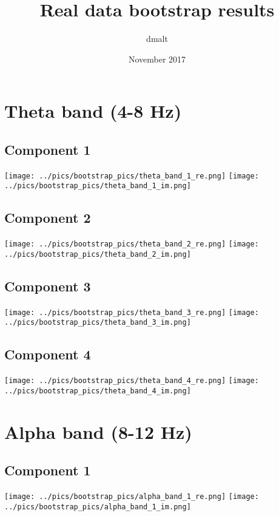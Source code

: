 \documentclass{article}
\title{Real data bootstrap results}
\author{dmalt}
\date{November 2017}
\begin{document}
\newpage
\section{Theta band (4-8 Hz)}
\centering
\subsection*{Component 1}
\texttt{[image: ../pics/bootstrap\_pics/theta\_band\_1\_re.png]}
\hspace{2cm}
\texttt{[image: ../pics/bootstrap\_pics/theta\_band\_1\_im.png]}

\subsection*{Component 2}
\texttt{[image: ../pics/bootstrap\_pics/theta\_band\_2\_re.png]}
\hspace{2cm}
\texttt{[image: ../pics/bootstrap\_pics/theta\_band\_2\_im.png]}

\subsection*{Component 3}
\texttt{[image: ../pics/bootstrap\_pics/theta\_band\_3\_re.png]}
\hspace{2cm}
\texttt{[image: ../pics/bootstrap\_pics/theta\_band\_3\_im.png]}

\subsection*{Component 4}
\texttt{[image: ../pics/bootstrap\_pics/theta\_band\_4\_re.png]}
\hspace{2cm}
\texttt{[image: ../pics/bootstrap\_pics/theta\_band\_4\_im.png]}

\justify
\section{Alpha band (8-12 Hz)}
\centering
\subsection*{Component 1}
\texttt{[image: ../pics/bootstrap\_pics/alpha\_band\_1\_re.png]}
\hspace{2cm}
\texttt{[image: ../pics/bootstrap\_pics/alpha\_band\_1\_im.png]}
\end{document}

